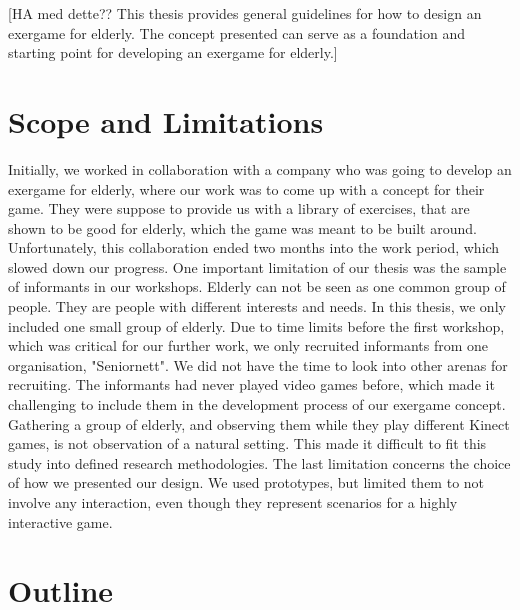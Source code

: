 [HA med dette?? This thesis provides general guidelines for how to design an exergame for elderly. The concept presented can serve as a foundation and starting point for developing an exergame for elderly.]     

\section{Scope and Limitations}
Initially, we worked in collaboration with a company who was going to develop an exergame for elderly, where our work was to come up with a concept for their game. They were suppose to provide us with a library of exercises, that are shown to be good for elderly, which the game was meant to be built around. Unfortunately, this collaboration ended two months into the work period, which slowed down our progress. One important limitation of our thesis was the sample of informants in our workshops. Elderly can not be seen as one common group of people. They are people with different interests and needs. In this thesis, we only included one small group of elderly. Due to time limits before the first workshop, which was critical for our further work, we only recruited informants from one organisation, "Seniornett". We did not have the time to look into other arenas for recruiting. The informants had never played video games before, which made it challenging to include them in the development process of our exergame concept. Gathering a group of elderly, and observing them while they play different Kinect games, is not observation of a natural setting. This made it difficult to fit this study into defined research methodologies. The last limitation concerns the choice of how we presented our design. We used prototypes, but limited them to not involve any interaction, even though they represent scenarios for a highly interactive game.  


\section{Outline}